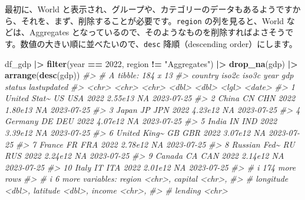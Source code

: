\documentclass[
  xelatex, ja=standard]{bxjsbook}
\newenvironment{Shaded}{\begin{snugshade}}{\end{snugshade}}
\newcommand{\CommentTok}[1]{\textcolor[rgb]{0.56,0.35,0.01}{\textit{#1}}}
\newcommand{\DecValTok}[1]{\textcolor[rgb]{0.00,0.00,0.81}{#1}}
\newcommand{\FunctionTok}[1]{\textcolor[rgb]{0.13,0.29,0.53}{\textbf{#1}}}
\newcommand{\NormalTok}[1]{#1}
\newcommand{\SpecialCharTok}[1]{\textcolor[rgb]{0.81,0.36,0.00}{\textbf{#1}}}
\newcommand{\StringTok}[1]{\textcolor[rgb]{0.31,0.60,0.02}{#1}}
\theoremstyle{definition}
\theoremstyle{definition}
\theoremstyle{definition}
\theoremstyle{definition}
\theoremstyle{remark}
\begin{document}
最初に、World と表示され、グループや、カテゴリーのデータもあるようですから、それを、まず、削除することが必要です。\texttt{region} の列を見ると、World などは、Aggregates となっているので、そのようなものを削除すればよさそうです。数値の大きい順に並べたいので、\texttt{desc} 降順（descending order）にします。

\begin{Shaded}
\begin{Highlighting}[]
\NormalTok{df\_gdp }\SpecialCharTok{|\textgreater{}} \FunctionTok{filter}\NormalTok{(year }\SpecialCharTok{==} \DecValTok{2022}\NormalTok{, region }\SpecialCharTok{!=} \StringTok{"Aggregates"}\NormalTok{) }\SpecialCharTok{|\textgreater{}} 
  \FunctionTok{drop\_na}\NormalTok{(gdp) }\SpecialCharTok{|\textgreater{}} \FunctionTok{arrange}\NormalTok{(}\FunctionTok{desc}\NormalTok{(gdp))}
\CommentTok{\#\textgreater{} \# A tibble: 184 x 13}
\CommentTok{\#\textgreater{}    country      iso2c iso3c  year     gdp status lastupdated}
\CommentTok{\#\textgreater{}    \textless{}chr\textgreater{}        \textless{}chr\textgreater{} \textless{}chr\textgreater{} \textless{}dbl\textgreater{}   \textless{}dbl\textgreater{} \textless{}lgl\textgreater{}  \textless{}date\textgreater{}     }
\CommentTok{\#\textgreater{}  1 United Stat\textasciitilde{} US    USA    2022 2.55e13 NA     2023{-}07{-}25 }
\CommentTok{\#\textgreater{}  2 China        CN    CHN    2022 1.80e13 NA     2023{-}07{-}25 }
\CommentTok{\#\textgreater{}  3 Japan        JP    JPN    2022 4.23e12 NA     2023{-}07{-}25 }
\CommentTok{\#\textgreater{}  4 Germany      DE    DEU    2022 4.07e12 NA     2023{-}07{-}25 }
\CommentTok{\#\textgreater{}  5 India        IN    IND    2022 3.39e12 NA     2023{-}07{-}25 }
\CommentTok{\#\textgreater{}  6 United King\textasciitilde{} GB    GBR    2022 3.07e12 NA     2023{-}07{-}25 }
\CommentTok{\#\textgreater{}  7 France       FR    FRA    2022 2.78e12 NA     2023{-}07{-}25 }
\CommentTok{\#\textgreater{}  8 Russian Fed\textasciitilde{} RU    RUS    2022 2.24e12 NA     2023{-}07{-}25 }
\CommentTok{\#\textgreater{}  9 Canada       CA    CAN    2022 2.14e12 NA     2023{-}07{-}25 }
\CommentTok{\#\textgreater{} 10 Italy        IT    ITA    2022 2.01e12 NA     2023{-}07{-}25 }
\CommentTok{\#\textgreater{} \# i 174 more rows}
\CommentTok{\#\textgreater{} \# i 6 more variables: region \textless{}chr\textgreater{}, capital \textless{}chr\textgreater{},}
\CommentTok{\#\textgreater{} \#   longitude \textless{}dbl\textgreater{}, latitude \textless{}dbl\textgreater{}, income \textless{}chr\textgreater{},}
\CommentTok{\#\textgreater{} \#   lending \textless{}chr\textgreater{}}
\end{Highlighting}
\end{Shaded}
\end{document}
